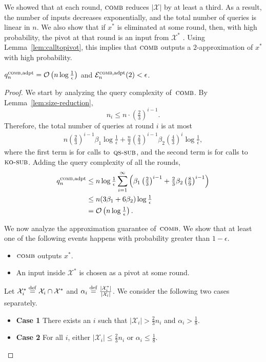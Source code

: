 \documentclass[twoside,11pt]{article}
\newcommand{\df}[1][\rm{def}]{\stackrel{#1}{=}}
\newcommand{\cO}{\mathcal{O}}
\newcommand{\cX}{\mathcal{X}}
\newcommand{\cE}{\mathcal{E}}
\newcommand{\algorithms}[1]{\textsc{#1}}
\newcommand{\algkosub}{\algorithms{ko-sub}}
\newcommand{\algqssub}{\algorithms{qs-sub}}
\newcommand{\algcomb}{\algorithms{comb}}
\newcommand{\maxx}{x^*}
\newcommand{\pe}{\cE}
\newcommand{\adaptive}{\textnormal{adpt}}
\newcommand{\errorcomb}{\epsilon}
\begin{document}
We showed that at each round, $\algcomb$ reduces $|\cX|$ by at least a third. As a result, the number of inputs decreases exponentially, and the total number of queries is linear in $n$.  We also show that if $\maxx$ is eliminated at some round, then, with high probability, the pivot at that round is an input from $\cX^*$ . Using Lemma~\ref{lem:calltopivot}, this implies that $\algcomb$ outputs a $2$-approximation of $\maxx$ with high probability.

\begin{theorem}
\label{thm:qks}
$q_n^{\algcomb,\adaptive}=\cO\left(n\log \tfrac1\errorcomb\right)$ and $\pe_n^{\algcomb,\adaptive}(2) < \errorcomb$.
\end{theorem}
\begin{proof}
We start by analyzing the query complexity of~$\algcomb$. By Lemma~\ref{lem:size-reduction},
\[
n_i\le n\cdot \left(\tfrac{2}{3}\right)^{i-1}.
\]
Therefore, the total number of queries at round $i$ is at most
\begin{align*}
n\left(\tfrac{2}{3}\right)^{i-1} \beta_1\log\tfrac1\errorcomb + \tfrac{n}{2} \left(\tfrac23\right)^{i-1}\beta_2 \left(\tfrac43\right)^i \log\tfrac1\errorcomb,
\end{align*}
where the first term is for calls to~$\algqssub$, and the second
term is for calls to~$\algkosub$. Adding the query complexity of all
the rounds,
\begin{align*}
 q_n^{\algcomb,\adaptive}&\le n\log\tfrac1\errorcomb\sum_{i=1}^\infty  \left(\beta_1\left(\tfrac{2}{3}\right)^{i-1}+\tfrac23 \beta_2 \left(\tfrac{8}{9}\right)^{i-1}\right)\\
 &\le n(3\beta_1+6\beta_2) \log\tfrac1\errorcomb\\
 &=\cO\left(n\log\tfrac1\errorcomb\right).
\end{align*}

We now analyze the approximation guarantee of~$\algcomb$.  We show that at least one of the following events happens with probability greater than $1-\errorcomb$.
\begin{itemize}
\item $\algcomb$ outputs $\maxx$.
\item An input inside $\cX^*$ is chosen as a pivot at some round.  
\end{itemize}

Let $\cX_i^*\df\cX_i \cap \cX^*$ and $\alpha_i\df\frac{|\cX_i^*|}{|\cX_i|}$.
We consider the following two cases separately.
\begin{itemize}
 \item \textbf{Case 1} There exists an $i$ such that $|\cX_i|>\frac23 n_i$ and $\alpha_i > \frac18$.
 \item \textbf{Case 2} For all $i$, either  $|\cX_i|\le\frac23 n_i$ or $\alpha_i \le \frac18$.
\end{itemize}


\end{proof}
\end{document}

